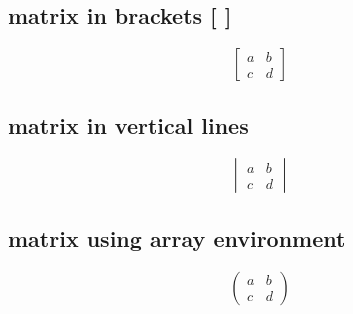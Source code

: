 \documentclass{article}
\begin{document}
\subsection{matrix in brackets [ ]}
\begin{equation}
\begin{bmatrix}
a&b\\
c&d
\end{bmatrix}
\end{equation}
\subsection{matrix in vertical lines}
\begin{equation}
\begin{vmatrix}
a&b\\
c&d
\end{vmatrix}
\end{equation}
\subsection{matrix using array environment}
\begin{equation}
\left(%
\begin{array}{cc}
a&b\\
c&d
\end{array}
\right)%
\end{equation}
\end{document}
